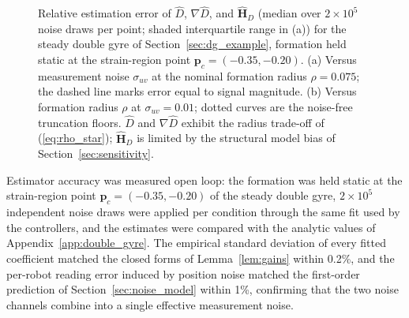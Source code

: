 \documentclass[12pt, letterpaper, oneside]{report}
\begin{document}
\begin{figure}[!t]
    \centering
    \framebox[0.9\linewidth]{\rule{0pt}{3.0cm}}
    \caption{Relative estimation error of $\hat{D}$, $\nabla\hat{D}$, and
    $\hat{\mathbf{H}}_D$ (median over $2 \times 10^5$ noise draws per point;
    shaded interquartile range in (a)) for the steady double gyre of
    Section~\ref{sec:dg_example}, formation held static at the
    strain-region point $\mathbf{p}_c = (-0.35, -0.20)$. (a) Versus measurement noise $\sigma_{uv}$ at the nominal
    formation radius $\rho = 0.075$; the dashed line marks error equal to
    signal magnitude. (b) Versus formation radius $\rho$ at $\sigma_{uv} =
    0.01$; dotted curves are the noise-free truncation floors. $\hat{D}$
    and $\nabla\hat{D}$ exhibit the radius trade-off of (\ref{eq:rho_star});
    $\hat{\mathbf{H}}_D$ is limited by the structural model bias of
    Section~\ref{sec:sensitivity}.}
    \label{fig:est_accuracy}
\end{figure}

Estimator accuracy was measured open loop: the formation was held static
at the strain-region point $\mathbf{p}_c = (-0.35, -0.20)$ of the steady
double gyre, $2 \times 10^5$ independent noise draws were applied per
condition through the same fit used by the controllers, and the estimates
were compared with the analytic values of Appendix~\ref{app:double_gyre}.
The empirical standard deviation of every fitted coefficient matched the
closed forms of Lemma~\ref{lem:gains} within 0.2\%, and the per-robot
reading error induced by position noise matched the first-order
prediction of Section~\ref{sec:noise_model} within 1\%, confirming that
the two noise channels combine into a single effective measurement noise.
\end{document}
